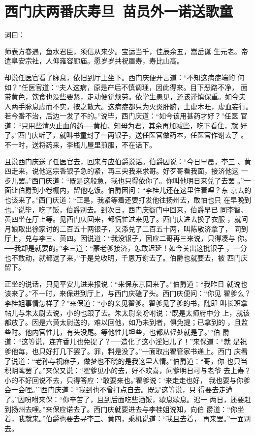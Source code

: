 \chapter{西门庆两番庆寿旦~苗员外一诺送歌童}

词曰：

师表方眷遇，鱼水君臣，须信从来少。宝运当千，佳辰余五，嵩岳诞
生元老。帝遣阜安宗社，人仰雍容廊庙。愿岁岁共祝眉寿，寿比山高。

却说任医官看了脉息，依旧到厅上坐下。西门庆便开言道：“不知这病症端的
何如？”任医官道：“夫人这病，原是产后不慎调理，因此得来。目下恶路不净，
面带黄色，饮食也没些要紧，走动便觉烦劳。依学生愚见，还该谨慎保重。如今夫
人两手脉息虚而不实，按之散大。这病症都只为火炎肝腑，土虚木旺，虚血妄行。
若今番不治，后边一发了不的。”说毕，西门庆道：“如今该用甚药才好？”任医
官道：“只用些清火止血的药──黄柏、知母为君，其余再加减些，吃下看住，就
好了。”西门庆听了，就叫书童封了一两银子，送任医官做药本，任医官作谢去了
。不一时，送将药来，李瓶儿屋里煎服，不在话下。

且说西门庆送了任医官去，回来与应伯爵说话。伯爵因说：“今日早晨，李三
、黄四走来，说他这宗香银子急的紧，再三央我来求哥。好歹哥看我面，接济他这
一步儿罢。”西门庆道：“既是这般急，我也只得依你了。你叫他明日来兑了去罢
。”一面让伯爵到小卷棚内，留他吃饭。伯爵因问：“李桂儿还在这里住着哩？东
京去的也该来了。”西门庆道：“正是，我紧等着还要打发他往扬州去，敢怕也只
在早晚到也。”说毕，吃了饭，伯爵别去。到次日，西门庆衙门中回来，伯爵早已
同李智、黄四坐在厅上等。见西门庆回来，都慌忙过来见了。西门庆进去换了衣服
，就问月娘取出徐家讨的二百五十两银子，又添兑了二百五十两，叫陈敬济拿了，
同到厅上，兑与李三、黄四。因说道：“我没银子，因应二哥再三来说，只得凑与
你。──我却是就要的。”李三道：“蒙老爹接济，怎敢迟延！如今关出这批银子
，一分也不敢动，就都送了来，”于是兑收明，千恩万谢去了。伯爵也就要去，被
西门庆留下。

正坐的说话，只见平安儿进来报说：“来保东京回来了。”伯爵道：“我昨日
就说也该来了。”不一时，来保进到厅上，与西门庆磕了头。西门庆便问：“你见
翟爹么？李桂姐事情怎样了？”来保道：“小的亲见翟爹。翟爹见了爹的书，随即
叫长班拿帖儿与朱太尉去说，小的也跟了去。朱太尉亲吩咐说：‘既是太师府中分
上，就该都放了。因是六黄太尉送的，难以回他，如乃未到者，俱免提；已拿到的
，且监些时。他内官性儿，有头没尾。等他性儿坦些，也都从轻处就是了。’”伯
爵道：“这等说，连齐香儿也免提了？──造化了这小淫妇儿了！”来保道：“就
是祝爹他每，也只好打几下罢了。罪，料是没了。”一面取出翟管家书递上。西门
庆看了说道：“老孙与祝麻子，做梦也不晓的是我这里人情。”伯爵道：“哥，你
也只当积阴骘罢了。”来保又说：“翟爹见小的去，好不欢喜，问爹明日可与老爷
去上寿？小的不好回说不去，只得答应：‘敢要来也。’翟爹说：‘来走走也好，
我也要与你爹会一会哩。’”西门庆道：“我到也不曾打点自去。既是这等说，只
得要去走遭了。”因吩咐来保：“你辛苦了，且到后面吃些酒饭，歇息歇息。迟一
两日，还要赶到扬州去哩。”来保应诺去了。西门庆就要进去与李桂姐说知，向伯
爵道：“你坐着，我就来。”伯爵也要去寻李三、黄四，乘机说道：“我且去着，
再来罢。”一面别去。

